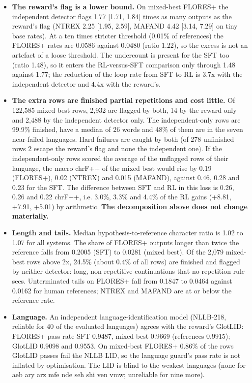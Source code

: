 \begin{itemize}
\item \textbf{The reward's flag is a lower bound.} On mixed-best FLORES+ the independent detector flags 1.77 [1.71, 1.84] times as many outputs as the reward's flag (NTREX 2.25 [1.95, 2.59], MAFAND 4.42 [3.14, 7.29] on tiny base rates). At a ten times stricter threshold (0.01\% of references) the FLORES+ rates are 0.0586 against 0.0480 (ratio 1.22), so the excess is not an artefact of a loose threshold. The undercount is present for the SFT too (ratio 1.48), so it enters the RL-versus-SFT comparison only through 1.48 against 1.77; the reduction of the loop rate from SFT to RL is 3.7x with the independent detector and 4.4x with the reward's.
\item \textbf{The extra rows are finished partial repetitions and cost little.} Of 122,585 mixed-best rows, 2,932 are flagged by both, 14 by the reward only and 2,488 by the independent detector only. The independent-only rows are 99.9\% finished, have a median of 26 words and 48\% of them are in the seven near-failed languages. Hard failures are caught by both (of 278 unfinished rows 2 escape the reward's flag and none the independent one). If the independent-only rows scored the average of the unflagged rows of their language, the macro chrF++ of the mixed best would rise by 0.19 (FLORES+), 0.02 (NTREX) and 0.015 (MAFAND), against 0.46, 0.28 and 0.23 for the SFT. The difference between SFT and RL in this loss is 0.26, 0.26 and 0.22 chrF++, i.e. 3.0\%, 3.3\% and 4.4\% of the RL gains (+8.81, +7.91, +5.01) by arithmetic. \textbf{The decomposition above does not change materially.} 
\item \textbf{Length and tails.} Median hypothesis-to-reference character ratio is 1.02 to 1.07 for all systems. The share of FLORES+ outputs longer than twice the reference falls from 0.2005 (SFT) to 0.0281 (mixed best). Of the 2,079 mixed-best rows above 2x, 24.5\% (about 0.4\% of all rows) are finished and flagged by neither detector: long, non-repetitive continuations that no repetition rule sees. Unterminated tails on FLORES+ fall from 0.1847 to 0.0464 against 0.0162 for human references; NTREX and MAFAND are at or below the reference rate. 
\item \textbf{Language.} An independent language-identification model (NLLB-218, reliable for 40 of the evaluated languages) agrees with the reward's GlotLID: FLORES+ pass rate SFT 0.9487, mixed best 0.9669 (references 0.9915); GlotLID 0.9098 and 0.9553. On mixed-best FLORES+ 0.86\% of the rows GlotLID passes fail the NLLB LID, so the language guard's pass rate is not inflated by optimisation. The LID is blind to the weakest languages (none for aeb ary arz mfe nde seh shi ven vmw; unreliable for nine more). 
\end{itemize}

